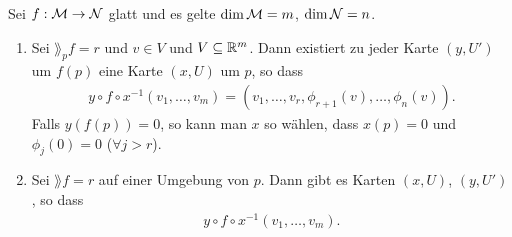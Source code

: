 \begin{satz}
\label{satz:Satz über implizite Funtionen}
\end{satz}
Sei $f: \mathcal{M} \to \mathcal{N}$ glatt und es gelte $\dim\mathcal{M}=m$, $\dim{\mathcal{N}} = n$.
\begin{enumerate}
\item Sei $\rang_p f = r$ und $v \in V$ und $V \subseteq \mathbb{R}^m$. 
Dann existiert zu jeder Karte  $(y, U')$ um $f(p)$ eine Karte $(x, U)$ um $p$, so dass
\begin{align}
y \circ f \circ x^{-1}(v_1, \dots, v_m) = (v_1, \dots, v_r, \phi_{r+1}(v), \dots, \phi_n(v)).
\end{align}
Falls $y(f(p))=0$, so kann man $x$ so wählen, dass $x(p)=0$ und $\phi_j (0) = 0$ ($\forall j > r$).
\item Sei $\rang f = r$ auf einer Umgebung von $p$.
Dann gibt es Karten $(x, U)$, $(y, U')$, so dass 
\begin{align}
y\circ f \circ x^{-1} (v_1, \dots, v_m).
\end{align}

\end{enumerate}
